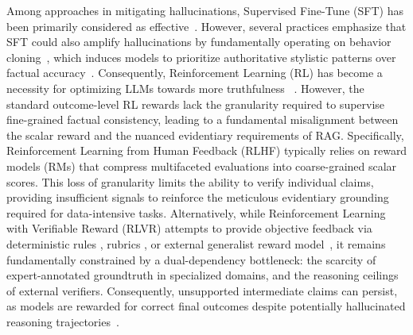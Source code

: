 \documentclass[10pt, a4paper, logo]{googledeepmind} %
\begin{document}
Among approaches in mitigating hallucinations, Supervised Fine-Tune (SFT) has been primarily considered as effective~\citep{elaraby2023haloestimationreductionhallucinations,lin2022truthfulqameasuringmodelsmimic,zhou2023limaalignment}. However, several practices emphasize that SFT could also amplify hallucinations by fundamentally operating on behavior cloning~\citep{torabi2018behavioral}, which induces models to prioritize authoritative stylistic patterns over factual accuracy~\citep{casper2023openproblemsfundamentallimitations,zhang2025sirenssongaiocean,gekhman2024doesfinetuningllmsnew}.
Consequently, Reinforcement Learning (RL) has become a necessity for optimizing LLMs towards more truthfulness
~\citep{yang2025qwen3technicalreport,gemmateam2025gemma3technicalreport}. 
However, the standard outcome-level RL rewards lack the granularity required to supervise fine-grained factual consistency, leading to a fundamental misalignment between the scalar reward and the nuanced evidentiary requirements of RAG.
%
Specifically, Reinforcement Learning from Human Feedback (RLHF) \citep{ouyang2022training} typically relies on reward models (RMs) \citep{bradley1952rank,li2025eliminatinginductivebiasreward,li-etal-2025-aplot,liu2024skyworkrewardbagtricksreward} that compress multifaceted evaluations into coarse-grained scalar scores. This loss of granularity limits the ability to verify individual claims, providing insufficient signals to reinforce the meticulous evidentiary grounding required for data-intensive tasks. Alternatively, while Reinforcement Learning with Verifiable Reward (RLVR) \citep{deepseekai2025deepseekr1incentivizingreasoningcapability} attempts to provide objective feedback via deterministic rules \citep{shao2024deepseekmathpushinglimitsmathematical}, rubrics \citep{gunjal2025rubricsrewardsreinforcementlearning}, or external generalist reward model~\citep{liu2025inferencetimescalinggeneralistreward}, it remains fundamentally constrained by a dual-dependency bottleneck: the scarcity of expert-annotated groundtruth in specialized domains, and the reasoning ceilings of external verifiers. Consequently, unsupported intermediate claims can persist, as models are rewarded for correct final outcomes despite potentially hallucinated reasoning trajectories~\citep{li2025reasoningmodelshallucinatemore}.
\end{document}
